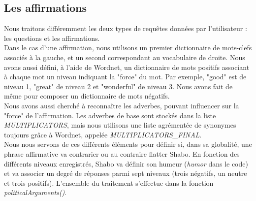 \documentclass[paper=a4]{article}
\begin{document}
\subsection{Les affirmations}

Nous traitons différemment les deux types de requêtes données par
l'utilisateur : les questions et les affirmations. \\

Dans le cas d'une affirmation, nous utilisons un premier dictionnaire de
mots-clefs associés à la gauche, et un second correspondant au
vocabulaire de droite. Nous avons aussi défini, à l'aide de Wordnet, un
dictionnaire de mots positifs associant à chaque mot un niveau indiquant
la "force" du mot. Par exemple, "good" est de niveau 1, "great" de
niveau 2 et "wonderful" de niveau 3.
Nous avons fait de même pour composer un dictionnaire de mots négatifs. \\

Nous avons aussi cherché à reconnaître les adverbes, pouvant influencer
sur la "force" de l'affirmation. Les adverbes de base sont stockés dans
la liste \textit{MULTIPLICATORS}, mais nous utilisons une liste agrémentée
de synonymes toujours grâce à Wordnet, appelée
\textit{MULTIPLICATORS\_FINAL}. \\

Nous nous servons de ces différents éléments pour définir si, dans sa
globalité, une phrase affirmative va contrarier ou au contraire flatter
Shabo. En fonction des différents niveaux enregistrés, Shabo va
définir son humeur (\textit{humor} dans le code) et va associer un degré
de réponses parmi sept niveaux (trois négatifs, un neutre et trois
positifs). L'ensemble du traitement s'effectue dans la fonction
\textit{politicalArguments()}. \\
\end{document}
